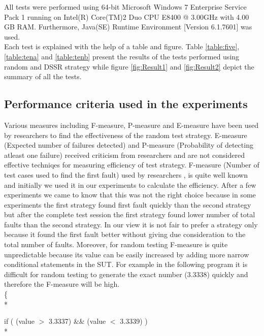 \documentclass[10pt, conference, compsocconf]{IEEEtran}
\begin{document}
All tests were performed using 64-bit Microsoft Windows 7 Enterprise Service Pack 1 running on Intel(R) Core(TM)2 Duo CPU E8400 @ 3.00GHz with 4.00 GB RAM. Furthermore, Java(SE) Runtime Environment [Version 6.1.7601] was used.\\

Each test is explained with the help of a table and figure. Table \ref{table:five}, \ref{table:tena} and \ref{table:tenb} present the results of the tests performed using random and DSSR strategy while figure \ref{fig:Result1} and \ref{fig:Result2} depict the summary of all the tests.



\subsection{Performance criteria used in the experiments}
Various measures including F-measure, P-measure and E-measure have been used by researchers to find the effectiveness of the random test strategy. E-measure (Expected number of failures detected) and P-measure (Probability of detecting atleast one failure) received criticism from researchers \cite{Chen2008} and are not considered effective techniqes for measuring efficiency of test strategy. F-measure (Number of test cases used to find the first fault) used by researchers  \cite{Chen1996}, \cite{Chen2004} is quite well known and initially we used it in our experiments to calculate the efficiency. After a few experiments we came to know that this was not the right choice because in some experiments the first strategy found first fault quickly than the second strategy but after the complete test session the first strategy found lower number of total faults than the second strategy. In our view it is not fair to prefer a strategy only because it found the first fault better without giving due consideration to the total number of faults. Moreover, for random testing F-measure is quite unpredictable because its value can be easily increased by adding more narrow conditional statements in the SUT. For example in the following program it is difficult for random testing to generate the exact number (3.3338) quickly and therefore the F-measure will be high.\\

\{ \\*   

\hspace{07 mm}if ( (value $>$  3.3337) \&\& (value $<$ 3.3339) )\\*
\end{document}
